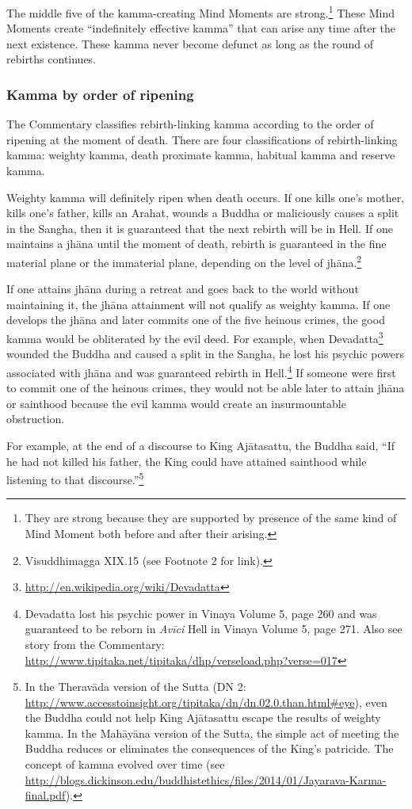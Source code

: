 The middle five of the kamma-creating Mind Moments are strong.\footnote{They are strong because they are supported by presence of the same kind of Mind Moment both before and after their arising.} These Mind Moments create “indefinitely effective kamma” that can arise any time after the next existence. These kamma never become defunct as long as the round of rebirths continues.

\subsubsection*{Kamma by order of ripening}

The Commentary classifies rebirth-linking kamma according to the order of ripening at the moment of death. There are four classifications of rebirth-linking kamma: weighty kamma, death proximate kamma, habitual kamma and reserve kamma.

Weighty kamma will definitely ripen when death occurs. If one kills one’s mother, kills one’s father, kills an Arahat, wounds a Buddha or maliciously causes a split in the Sangha, then it is guaranteed that the next rebirth will be in Hell. If one maintains a jhāna until the moment of death, rebirth is guaranteed in the fine material plane or the immaterial plane, depending on the level of jhāna.\footnote{Visuddhimagga XIX.15 (see Footnote 2 for link).} 

If one attains jhāna during a retreat and goes back to the world without maintaining it, the jhāna attainment will not qualify as weighty kamma. If one develops the jhāna and later commits one of the five heinous crimes, the good kamma would be obliterated by the evil deed. For example, when Devadatta\footnote{\url{http://en.wikipedia.org/wiki/Devadatta}} wounded the Buddha and caused a split in the Sangha, he lost his psychic powers associated with jhāna and was guaranteed rebirth in Hell.\footnote{Devadatta lost his psychic power in Vinaya Volume 5, page 260 and was guaranteed to be reborn in \textit{Avīci} Hell in Vinaya Volume 5, page 271. Also see story from the Commentary: \url{http://www.tipitaka.net/tipitaka/dhp/verseload.php?verse=017}} If someone were first to commit one of the heinous crimes, they would not be able later to attain jhāna or sainthood because the evil kamma would create an insurmountable obstruction. 

For example, at the end of a discourse to King Ajātasattu, the Buddha said, “If he had not killed his father, the King could have attained sainthood while listening to that discourse.”\footnote{In the Theravāda version of the Sutta (DN 2: \url{http://www.accesstoinsight.org/tipitaka/dn/dn.02.0.than.html\#eye}), even the Buddha could not help King Ajātasattu escape the results of weighty kamma. In the Mahāyāna version of the Sutta, the simple act of meeting the Buddha reduces or eliminates the consequences of the King’s patricide. The concept of kamma evolved over time (see \url{http://blogs.dickinson.edu/buddhistethics/files/2014/01/Jayarava-Karma-final.pdf}).}

